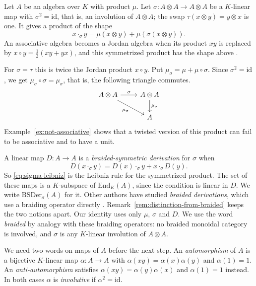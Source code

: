 \documentclass[]{interact}
\theoremstyle{plain}
\theoremstyle{definition}
\theoremstyle{remark}
\newcommand{\BSDer}{\mathrm{BSDer}}
\begin{document}
Let $A$ be an algebra over $K$ with product $\mu$.
Let $\sigma \colon A \otimes A \to A \otimes A$ be a $K$-linear map with $\sigma^2 = \mathrm{id}$, that is, an involution of $A \otimes A$; the swap $\tau(x \otimes y) = y \otimes x$ is one.
It gives a product of the shape
\begin{equation}\label{eq:sigma-product}
x \cdot_\sigma y = \mu(x \otimes y) + \mu(\sigma(x \otimes y)).
\end{equation}
An associative algebra becomes a Jordan algebra when its product $xy$ is replaced by $x \circ y = \tfrac12(xy + yx)$, and this symmetrized product has the shape above \citep[Example 2.1]{BresarZelmanov2025}.

For $\sigma = \tau$ this is twice the Jordan product $x \circ y$.
Put $\mu_\sigma = \mu + \mu \circ \sigma$.
Since $\sigma^2 = \mathrm{id}$, we get $\mu_\sigma \circ \sigma = \mu_\sigma$, that is, the following triangle commutes.
\[
\begin{tikzcd}
A \otimes A \arrow[r, "\sigma"] \arrow[rd, "\mu_\sigma"'] & A \otimes A \arrow[d, "\mu_\sigma"] \\
& A
\end{tikzcd}
\]
Example~\ref{ex:not-associative} shows that a twisted version of this product can fail to be associative and to have a unit.

A linear map $D \colon A \to A$ is a \emph{braided-symmetric derivation} for $\sigma$ when %
\begin{equation}\label{eq:sigma-leibniz}
D(x \cdot_\sigma y) = D(x) \cdot_\sigma y + x \cdot_\sigma D(y).
\end{equation}
So \eqref{eq:sigma-leibniz} is the Leibniz rule for the symmetrized product.
The set of these maps is a $K$-subspace of $\mathrm{End}_K(A)$, since the condition is linear in $D$.
We write $\BSDer_\sigma(A)$ for it.
Other authors have studied \emph{braided derivations}, which use a braiding operator directly \citep[\S2]{Rozanski1996} \citep[\S4.1, Definition 14]{Huru2006}. %
Remark~\ref{rem:distinction-from-braided} keeps the two notions apart.
Our identity uses only $\mu$, $\sigma$ and $D$.
We use the word \emph{braided} by analogy with these braiding operators: no braided monoidal category is involved, and $\sigma$ is any $K$-linear involution of $A \otimes A$. %

We need two words on maps of $A$ before the next step.
An \emph{automorphism} of $A$ is a bijective $K$-linear map $\alpha \colon A \to A$ with $\alpha(xy) = \alpha(x)\alpha(y)$ and $\alpha(1) = 1$.
An \emph{anti-automorphism} satisfies $\alpha(xy) = \alpha(y)\alpha(x)$ and $\alpha(1) = 1$ instead. %
In both cases $\alpha$ is \emph{involutive} if $\alpha^2 = \mathrm{id}$. %
\end{document}
